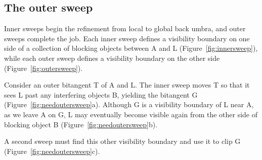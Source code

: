 \documentclass[9pt,twocolumn]{article}
\newif\ifJournal
\newif\ifTalk
\begin{document}
\ifJournal
Figure~\ref{fig:localvsglobalpure}b illustrates a global back umbra computed 
using inner sweeps to refine the local back umbra.
(GET A MORE ELABORATE EXAMPLE, PERHAPS ONE THAT DOES NOT REQUIRE AN OUTER SWEEP.)
\fi



\subsection{The outer sweep}

Inner sweeps begin the refinement from local to global back umbra,
and outer sweeps complete the job.
Each inner sweep defines a visibility boundary on one side of a collection of
blocking objects between A and L (Figure~\ref{fig:innersweep}), %
while each outer sweep defines a visibility boundary on the other side (Figure~\ref{fig:outersweep}). %




Consider an outer bitangent T of A and L.
The inner sweep moves T so that it sees L past any interfering objects B,
yielding the bitangent G (Figure~\ref{fig:needoutersweep}a).
Although G is a visibility boundary of L near A,
as we leave A on G, 
L may eventually become visible again from the other side of blocking object B
(Figure~\ref{fig:needoutersweep}b).  %
\ifTalk
A sunrise to match the sunset.
\fi
A second sweep must find this other visibility boundary and use it to clip G
(Figure~\ref{fig:needoutersweep}c).
\end{document}
